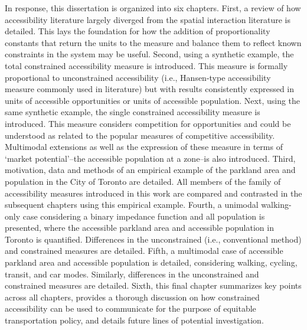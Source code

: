 \documentclass[
11pt, %
oneside, %
english, %
singlespacing, %
]{macthesis} %
\def\blankpage{%
      \clearpage%
      \thispagestyle{empty}%
      \addtocounter{page}{-1}%
      \null%
      \clearpage}
\begin{document}
In response, this dissertation is organized into six chapters. First, a review of how accessibility literature largely diverged from the spatial interaction literature is detailed. This lays the foundation for how the addition of proportionality constants that return the units to the measure and balance them to reflect known constraints in the system may be useful. Second, using a synthetic example, the total constrained accessibility measure is introduced. This measure is formally proportional to unconstrained accessibility (i.e., Hansen-type accessibility measure commonly used in literature) but with results consistently expressed in units of accessible opportunities or units of accessible population. Next, using the same synthetic example, the single constrained accessibility measure is introduced. This measure considers competition for opportunities and could be understood as related to the popular measures of competitive accessibility. Multimodal extensions as well as the expression of these measure in terms of `market potential'--the accessible population at a zone--is also introduced. Third, motivation, data and methods of an empirical example of the parkland area and population in the City of Toronto are detailed. All members of the family of accessibility measures introduced in this work are compared and contrasted in the subsequent chapters using this empirical example. Fourth, a unimodal walking-only case considering a binary impedance function and all population is presented, where the accessible parkland area and accessible population in Toronto is quantified. Differences in the unconstrained (i.e., conventional method) and constrained measures are detailed. Fifth, a multimodal case of accessible parkland area and accessible population is detailed, considering walking, cycling, transit, and car modes. Similarly, differences in the unconstrained and constrained measures are detailed. Sixth, this final chapter summarizes key points across all chapters, provides a thorough discussion on how constrained accessibility can be used to communicate for the purpose of equitable transportation policy, and details future lines of potential investigation.
\blankpage
\clearpage

\end{document}
